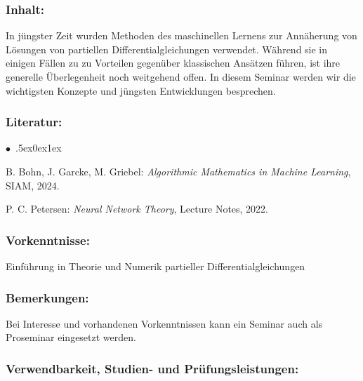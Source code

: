 \documentclass[a4paper,10pt]{article}
\renewenvironment{itemize}{\begin{list}{$\bullet$\ }{\itemsep.5ex\setlength{\topsep}{0.5\itemsep}\parsep0ex\labelsep1ex\settowidth{\labelwidth}{$\bullet$\ }\setlength{\leftmargin}{\labelwidth}\addtolength{\leftmargin}{3ex}\addtolength{\leftmargin}{\labelsep}}}{\end{list}}
\begin{document}
\subsubsection*{\large
    Inhalt:
}
In jüngster Zeit wurden Methoden des maschinellen Lernens zur Annäherung von Lösungen von partiellen Differentialgleichungen verwendet. Während sie in einigen Fällen zu zu Vorteilen gegenüber klassischen Ansätzen führen, ist ihre generelle Überlegenheit noch weitgehend offen. In diesem Seminar werden wir die wichtigsten Konzepte und jüngsten Entwicklungen besprechen.
\subsubsection*{\large
    Literatur:
}
\begin{itemize}
\item
B. Bohn, J. Garcke, M. Griebel: \emph{Algorithmic Mathematics in Machine Learning}, SIAM, 2024.
\item
P. C. Petersen: \emph{Neural Network Theory}, Lecture Notes, 2022. 
\end{itemize}
\subsubsection*{\large
    Vorkenntnisse:
}
Einführung in Theorie und Numerik partieller Differentialgleichungen
\subsubsection*{\large
    Bemerkungen:
}
Bei Interesse und vorhandenen Vorkenntnissen kann ein Seminar auch als Proseminar eingesetzt werden.
\cleardoublepage
\subsubsection*{\large
    Verwendbarkeit, Studien- und Prüfungsleistungen:
}
\end{document}
